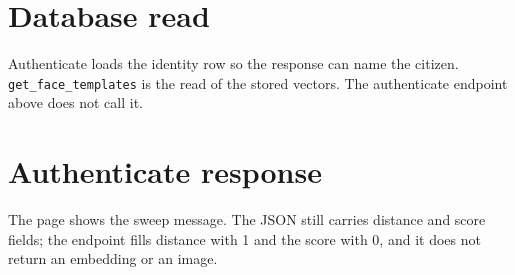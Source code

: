
\clearpage
\section{Database read}
\label{sec:db-read}
\back
{\sffamily\small\color{ink}Authenticate loads the identity row so the response can name the citizen.
\texttt{get\_face\_templates} is the read of the stored vectors. The authenticate endpoint above does not call it.}


\clearpage
\section{Authenticate response}
\label{sec:auth-response}
\back
{\sffamily\small\color{ink}The page shows the sweep message. The JSON still carries distance and score fields; the endpoint fills distance with 1 and the score with 0, and it does not return an embedding or an image.}

